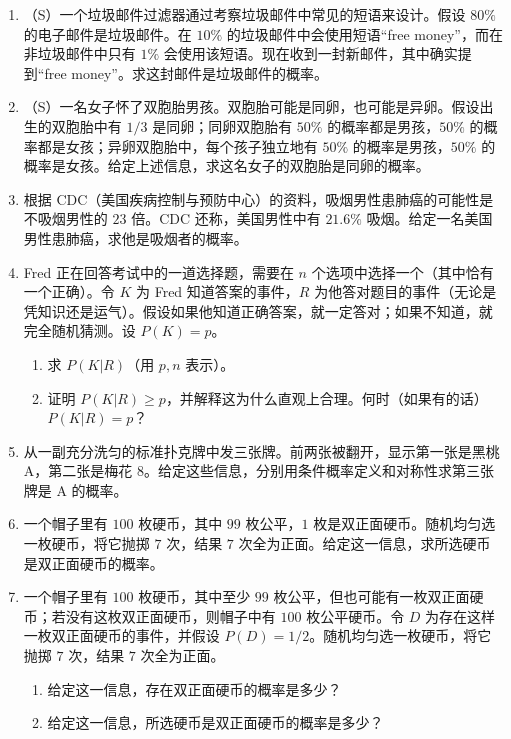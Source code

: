 \documentclass[UTF8, 12pt, fontset=fandol, oneside]{ctexart}
\begin{document}
\begin{enumerate}
  \item （S）一个垃圾邮件过滤器通过考察垃圾邮件中常见的短语来设计。假设 $80\%$ 的电子邮件是垃圾邮件。在 $10\%$ 的垃圾邮件中会使用短语“free money”，而在非垃圾邮件中只有 $1\%$ 会使用该短语。现在收到一封新邮件，其中确实提到“free money”。求这封邮件是垃圾邮件的概率。

  \item （S）一名女子怀了双胞胎男孩。双胞胎可能是同卵，也可能是异卵。假设出生的双胞胎中有 $1/3$ 是同卵；同卵双胞胎有 $50\%$ 的概率都是男孩，$50\%$ 的概率都是女孩；异卵双胞胎中，每个孩子独立地有 $50\%$ 的概率是男孩，$50\%$ 的概率是女孩。给定上述信息，求这名女子的双胞胎是同卵的概率。

  \item 根据 CDC（美国疾病控制与预防中心）的资料，吸烟男性患肺癌的可能性是不吸烟男性的 $23$ 倍。CDC 还称，美国男性中有 $21.6\%$ 吸烟。给定一名美国男性患肺癌，求他是吸烟者的概率。

  \item Fred 正在回答考试中的一道选择题，需要在 $n$ 个选项中选择一个（其中恰有一个正确）。令 $K$ 为 Fred 知道答案的事件，$R$ 为他答对题目的事件（无论是凭知识还是运气）。假设如果他知道正确答案，就一定答对；如果不知道，就完全随机猜测。设 $P(K)=p$。
  \begin{enumerate}
    \item 求 $P(K|R)$（用 $p,n$ 表示）。
    \item 证明 $P(K|R)\ge p$，并解释这为什么直观上合理。何时（如果有的话）$P(K|R)=p$？
  \end{enumerate}

  \item 从一副充分洗匀的标准扑克牌中发三张牌。前两张被翻开，显示第一张是黑桃 A，第二张是梅花 8。给定这些信息，分别用条件概率定义和对称性求第三张牌是 A 的概率。

  \item 一个帽子里有 $100$ 枚硬币，其中 $99$ 枚公平，$1$ 枚是双正面硬币。随机均匀选一枚硬币，将它抛掷 $7$ 次，结果 $7$ 次全为正面。给定这一信息，求所选硬币是双正面硬币的概率。

  \item 一个帽子里有 $100$ 枚硬币，其中至少 $99$ 枚公平，但也可能有一枚双正面硬币；若没有这枚双正面硬币，则帽子中有 $100$ 枚公平硬币。令 $D$ 为存在这样一枚双正面硬币的事件，并假设 $P(D)=1/2$。随机均匀选一枚硬币，将它抛掷 $7$ 次，结果 $7$ 次全为正面。
  \begin{enumerate}
    \item 给定这一信息，存在双正面硬币的概率是多少？
    \item 给定这一信息，所选硬币是双正面硬币的概率是多少？
  \end{enumerate}


\end{enumerate}
\end{document}
